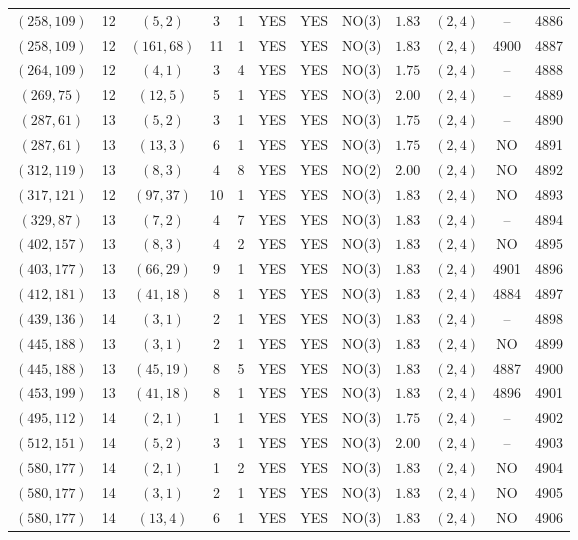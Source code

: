 \begin{longtable}{|c|c|c|c|c|c|c|c|c|c|c|c|}
$(258,109)$ & 12 & $(5,2)$ & 3 & 1 & YES & YES & NO(3) & $1.83$ & $(2,4)$ & -- & 4886\\
$(258,109)$ & 12 & $(161,68)$ & 11 & 1 & YES & YES & NO(3) & $1.83$ & $(2,4)$ & 4900 & 4887\\
$(264,109)$ & 12 & $(4,1)$ & 3 & 4 & YES & YES & NO(3) & $1.75$ & $(2,4)$ & -- & 4888\\
$(269,75)$ & 12 & $(12,5)$ & 5 & 1 & YES & YES & NO(3) & $2.00$ & $(2,4)$ & -- & 4889\\
$(287,61)$ & 13 & $(5,2)$ & 3 & 1 & YES & YES & NO(3) & $1.75$ & $(2,4)$ & -- & 4890\\
$(287,61)$ & 13 & $(13,3)$ & 6 & 1 & YES & YES & NO(3) & $1.75$ & $(2,4)$ & NO & 4891\\
$(312,119)$ & 13 & $(8,3)$ & 4 & 8 & YES & YES & NO(2) & $2.00$ & $(2,4)$ & NO & 4892\\
$(317,121)$ & 12 & $(97,37)$ & 10 & 1 & YES & YES & NO(3) & $1.83$ & $(2,4)$ & NO & 4893\\
$(329,87)$ & 13 & $(7,2)$ & 4 & 7 & YES & YES & NO(3) & $1.83$ & $(2,4)$ & -- & 4894\\
$(402,157)$ & 13 & $(8,3)$ & 4 & 2 & YES & YES & NO(3) & $1.83$ & $(2,4)$ & NO & 4895\\
$(403,177)$ & 13 & $(66,29)$ & 9 & 1 & YES & YES & NO(3) & $1.83$ & $(2,4)$ & 4901 & 4896\\
$(412,181)$ & 13 & $(41,18)$ & 8 & 1 & YES & YES & NO(3) & $1.83$ & $(2,4)$ & 4884 & 4897\\
$(439,136)$ & 14 & $(3,1)$ & 2 & 1 & YES & YES & NO(3) & $1.83$ & $(2,4)$ & -- & 4898\\
$(445,188)$ & 13 & $(3,1)$ & 2 & 1 & YES & YES & NO(3) & $1.83$ & $(2,4)$ & NO & 4899\\
$(445,188)$ & 13 & $(45,19)$ & 8 & 5 & YES & YES & NO(3) & $1.83$ & $(2,4)$ & 4887 & 4900\\
$(453,199)$ & 13 & $(41,18)$ & 8 & 1 & YES & YES & NO(3) & $1.83$ & $(2,4)$ & 4896 & 4901\\
$(495,112)$ & 14 & $(2,1)$ & 1 & 1 & YES & YES & NO(3) & $1.75$ & $(2,4)$ & -- & 4902\\
$(512,151)$ & 14 & $(5,2)$ & 3 & 1 & YES & YES & NO(3) & $2.00$ & $(2,4)$ & -- & 4903\\
$(580,177)$ & 14 & $(2,1)$ & 1 & 2 & YES & YES & NO(3) & $1.83$ & $(2,4)$ & NO & 4904\\
$(580,177)$ & 14 & $(3,1)$ & 2 & 1 & YES & YES & NO(3) & $1.83$ & $(2,4)$ & NO & 4905\\
$(580,177)$ & 14 & $(13,4)$ & 6 & 1 & YES & YES & NO(3) & $1.83$ & $(2,4)$ & NO & 4906\\

\end{longtable}
